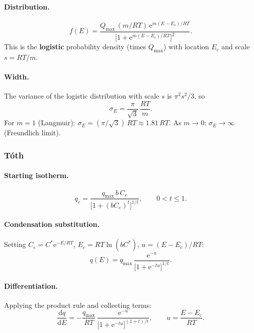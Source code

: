 \documentclass[journal=aamick,manuscript=article]{achemso}
\begin{document}
\paragraph{Distribution.}
\begin{equation}
	f(E) = \frac{Q_{\max}\,(m/RT)\,\mathrm{e}^{m(E-E_c)/RT}}
	           {\bigl[1+\mathrm{e}^{m(E-E_c)/RT}\bigr]^{2}}.
	\label{eq:si_fE_sips}
\end{equation}
This is the \textbf{logistic} probability density (times $Q_{\max}$)
with location $E_c$ and scale $s = RT/m$.

\paragraph{Width.}
The variance of the logistic distribution with scale $s$ is $\pi^2 s^2/3$, so
\begin{equation}
	\sigma_E = \frac{\pi}{\sqrt{3}}\,\frac{RT}{m}.
	\label{eq:si_sigmaE_sips}
\end{equation}
For $m=1$ (Langmuir): $\sigma_E = (\pi/\sqrt{3})\,RT \approx 1.81\,RT$.
As $m \to 0$: $\sigma_E \to \infty$ (Freundlich limit).

\subsubsection{T\'{o}th}

\paragraph{Starting isotherm.}
\begin{equation}
	q_e = \frac{q_{\max}\, b\, C_e}{\bigl[1+(b C_e)^{t}\bigr]^{1/t}},
	\qquad 0 < t \leq 1.
\end{equation}

\paragraph{Condensation substitution.}
Setting $C_e = C^{\ast}\mathrm{e}^{-E/RT}$, $E_c = RT\ln(bC^{\ast})$,
$u = (E-E_c)/RT$:
\begin{equation}
	q(E) = q_{\max}\,\frac{\mathrm{e}^{-u}}{\bigl[1+\mathrm{e}^{-tu}\bigr]^{1/t}}.
\end{equation}

\paragraph{Differentiation.}
Applying the product rule and collecting terms:
\begin{equation}
	\frac{\mathrm{d}q}{\mathrm{d}E}
	= -\frac{q_{\max}}{RT}\,\frac{\mathrm{e}^{-u}}
	                               {\bigl[1+\mathrm{e}^{-tu}\bigr]^{(1+t)/t}},
	\qquad u = \frac{E-E_c}{RT}.
\end{equation}
\end{document}
